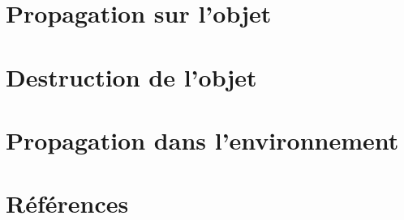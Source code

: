 \documentclass[a4paper,10pt]{article}
\begin{document}
\section{Propagation sur l'objet}





\section{Destruction de l'objet}





\section{Propagation dans l'environnement}


\section{Références}


\end{document}
